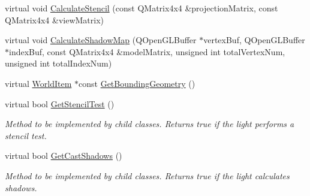 \begin{DoxyCompactItemize}
\item 
virtual void \mbox{\hyperlink{class_geometry_engine_1_1_geometry_world_item_1_1_geometry_light_1_1_light_ae50fab4782158671041ac986dfead7fc}{Calculate\+Stencil}} (const Q\+Matrix4x4 \&projection\+Matrix, const Q\+Matrix4x4 \&view\+Matrix)
\item 
virtual void \mbox{\hyperlink{class_geometry_engine_1_1_geometry_world_item_1_1_geometry_light_1_1_light_a76aff3602f7bf26416c36111ab79f898}{Calculate\+Shadow\+Map}} (Q\+Open\+G\+L\+Buffer $\ast$vertex\+Buf, Q\+Open\+G\+L\+Buffer $\ast$index\+Buf, const Q\+Matrix4x4 \&model\+Matrix, unsigned int total\+Vertex\+Num, unsigned int total\+Index\+Num)
\item 
virtual \mbox{\hyperlink{class_geometry_engine_1_1_geometry_world_item_1_1_world_item}{World\+Item}} $\ast$const \mbox{\hyperlink{class_geometry_engine_1_1_geometry_world_item_1_1_geometry_light_1_1_light_a53cc9a8e7ab6eab9d34f1655ef33eaef}{Get\+Bounding\+Geometry}} ()
\item 
\mbox{\label{class_geometry_engine_1_1_geometry_world_item_1_1_geometry_light_1_1_light_ac057b7a5229d61154d8a79f4467eb042}} 
virtual bool \mbox{\hyperlink{class_geometry_engine_1_1_geometry_world_item_1_1_geometry_light_1_1_light_ac057b7a5229d61154d8a79f4467eb042}{Get\+Stencil\+Test}} ()
\begin{DoxyCompactList}\small\item\em Method to be implemented by child classes. Returns true if the light performs a stencil test. \end{DoxyCompactList}\item 
\mbox{\label{class_geometry_engine_1_1_geometry_world_item_1_1_geometry_light_1_1_light_a3c5c36c23bc16960b6d3232c33673e0a}} 
virtual bool \mbox{\hyperlink{class_geometry_engine_1_1_geometry_world_item_1_1_geometry_light_1_1_light_a3c5c36c23bc16960b6d3232c33673e0a}{Get\+Cast\+Shadows}} ()
\begin{DoxyCompactList}\small\item\em Method to be implemented by child classes. Returns true if the light calculates shadows. \end{DoxyCompactList}\item 
\mbox{\label{class_geometry_engine_1_1_geometry_world_item_1_1_geometry_light_1_1_light_a18009ba6ef9c788f3d33d1ebd78a2140}} 

\end{DoxyCompactItemize}
